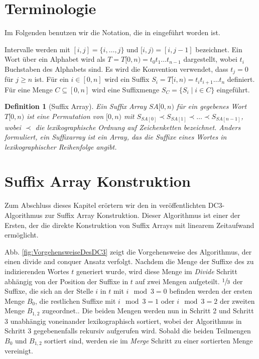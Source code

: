 \documentclass[12pt]{report}
\newtheorem{definition}{Definition}
\begin{document}
\section{Terminologie}
\label{sec:Terminologie}
Im Folgenden benutzen wir die Notation, die in \cite{Karkkainen2006} eingeführt worden ist.

Intervalle werden mit $[i,j] = \{ i, \dots, j\}$ und $[i,j) = [i,j-1]$ bezeichnet. Ein Wort über ein Alphabet wird als $T = T[0,n) = t_0 t_1 \dots t_{n-1}$ dargestellt, wobei $t_i$ Buchstaben des Alphabets sind. Es wird die Konvention verwendet, dass $t_j = 0$ für $j \ge n$ ist. Für ein $i \in [0,n]$ wird ein Suffix $S_i = T[i,n) = t_i t_{i+1} \dots t_n$ definiert. Für eine Menge $C \subseteq [0,n]$ wird eine Suffixmenge $S_C = \{ S_i \mid i \in C\}$ eingeführt.

\begin{definition}[Suffix Array]
Ein Suffix Array $SA[0,n)$ für ein gegebenes Wort $T[0,n)$ ist eine Permutation von $[0,n)$ mit $S_{SA[0]} \prec S_{SA[1]} \prec \dots \prec S_{SA[n-1]}$, wobei $\prec$ die lexikographische Ordnung auf Zeichenketten bezeichnet. Anders formuliert, ein Suffixarray ist ein Array, das die Suffixe eines Wortes in lexikographischer Reihenfolge angibt.
\end{definition}

\section{Suffix Array Konstruktion}
\label{sec:SuffixArrayKonstruktion}

Zum Abschluss dieses Kapitel erörtern wir den in \cite{Karkkainen2003} veröffentlichten DC3-Algorithmus zur Suffix Array Konstruktion. Dieser Algorithmus ist einer der Ersten, der die direkte Konstruktion von Suffix Arrays mit linearem Zeitaufwand ermöglicht.

Abb. \ref{fig:VorgehensweiseDesDC3} zeigt die Vorgehensweise des Algorithmus, der einen divide and conquer Ansatz verfolgt. Nachdem die Menge der Suffixe des zu indizierenden Wortes $t$ generiert wurde, wird diese Menge im \textit{Divide} Schritt abhängig von der Position der Suffixe in $t$ auf zwei Mengen aufgeteilt. $\sfrac{1}{3}$ der Suffixe, die sich an der Stelle $i$ in $t$ mit $i \mod 3 = 0$ befinden werden der ersten Menge $B_0$, die restlichen Suffixe mit $i \mod 3 = 1$ oder $i \mod 3 = 2$ der zweiten Menge $B_{1,2}$ zugeordnet.. Die beiden Mengen werden nun in Schritt 2 und Schritt 3 unabhängig voneinander lexikographisch sortiert, wobei der Algorithmus in Schritt 3 gegebenenfalls rekursiv aufgerufen wird. Sobald die beiden Teilmengen $B_0$ und $B_{1, 2}$ sortiert sind, werden sie im \textit{Merge} Schritt zu einer sortierten Menge vereinigt.
\end{document}
